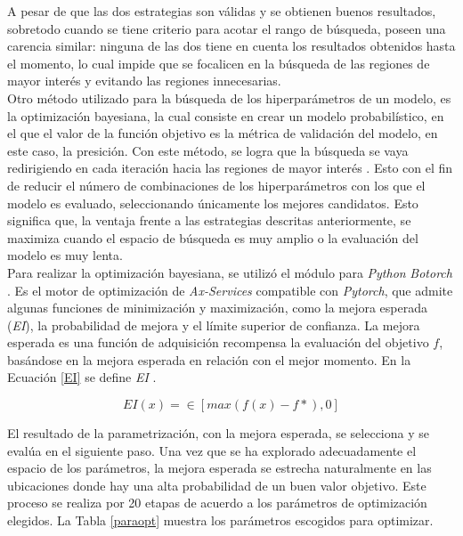 	A pesar de que las dos estrategias son válidas y se obtienen buenos resultados, sobretodo cuando se tiene criterio para acotar el rango de búsqueda, poseen una carencia similar: ninguna de las dos tiene en cuenta los resultados obtenidos hasta el momento, lo cual impide que se focalicen en la búsqueda de las regiones de mayor interés y evitando las regiones innecesarias.\\
	

	Otro método utilizado para la búsqueda de los hiperparámetros de un modelo, es la optimización bayesiana, la cual consiste en crear un modelo probabilístico, en el que el valor de la función objetivo es la métrica de validación del modelo, en este caso, la presición. Con este método, se logra que la búsqueda se vaya redirigiendo en cada iteración hacia las regiones de mayor interés \cite{frazier2018tutorial}. Esto con el fin de reducir el número de combinaciones de los hiperparámetros con los que el modelo es evaluado, seleccionando únicamente los mejores candidatos. Esto significa que, la ventaja frente a las estrategias descritas anteriormente, se maximiza cuando el espacio de búsqueda es muy amplio o la evaluación del modelo es muy lenta.\\
	
	Para realizar la optimización bayesiana, se utilizó el módulo para \textit{Python} \textit{Botorch}  \cite{balandat2020botorch}. Es el motor de optimización de \textit{Ax-Services} compatible con \textit{Pytorch}, que admite algunas funciones de minimización y maximización, como la mejora esperada (\textit{EI}), la probabilidad de mejora y el límite superior de confianza. La mejora esperada es una función de adquisición recompensa la evaluación del objetivo $f$, basándose en la mejora esperada en relación con el mejor momento. En la Ecuación \ref{EI} se define  \textit{EI} .
	
	\begin{equation}
		{EI(x)=\in[max(f(x)-f*),0]}
		\label{EI}
	\end{equation}
	
	El resultado de la parametrización, con la mejora esperada, se selecciona y se evalúa en el siguiente paso. Una vez que se ha explorado adecuadamente el espacio de los parámetros, la mejora esperada se estrecha naturalmente en las ubicaciones donde hay una alta probabilidad de un buen valor objetivo. Este proceso se realiza por 20 etapas de acuerdo a los parámetros de optimización elegidos. La Tabla \ref{paraopt} muestra los parámetros escogidos para optimizar.
	
